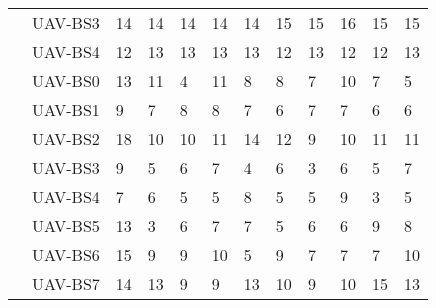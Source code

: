 \begin{table}[]
\begin{tabular}{|ll|l|l|l|l|l|l|l|l|l|l|}
\multicolumn{1}{|c|}{\cellcolor[HTML]{EFEFEF}}                                & UAV-BS3 & 14          & 14          & 14          & 14          & 14          & 15          & 15          & 16          &  15         & 15            \\ \cline{2-12} 
\rowcolor[HTML]{EFEFEF} 
\multicolumn{1}{|c|}{\multirow{-5}{*}{\cellcolor[HTML]{EFEFEF}\textbf{exp2}}} & UAV-BS4 & 12          & 13          & 13          & 13          & 13          & 12          & 13          & 12          & 12          & 13           \\ \hline
\multicolumn{1}{|l|}{}                                                        & UAV-BS0 & 13          & 11          & 4           & 11          & 8           & 8           & 7           & 10          & 7           & 5            \\ \cline{2-12} 
\multicolumn{1}{|l|}{}                                                        & UAV-BS1 & 9           & 7           & 8           & 8           & 7           & 6           & 7           & 7           & 6           & 6            \\ \cline{2-12} 
\multicolumn{1}{|l|}{}                                                        & UAV-BS2 & 18          & 10          & 10          & 11          & 14          & 12          & 9           & 10          & 11          & 11            \\ \cline{2-12} 
\multicolumn{1}{|l|}{}                                                        & UAV-BS3 & 9           & 5           & 6           & 7           & 4           & 6           & 3           & 6           & 5           & 7            \\ \cline{2-12} 
\multicolumn{1}{|l|}{}                                                        & UAV-BS4 & 7           & 6           & 5           & 5           & 8           & 5           & 5           & 9           & 3           & 5            \\ \cline{2-12} 
\multicolumn{1}{|l|}{}                                                        & UAV-BS5 & 13          & 3           & 6           & 7           & 7           & 5           & 6           & 6           & 9           & 8            \\ \cline{2-12} 
\multicolumn{1}{|l|}{}                                                        & UAV-BS6 & 15          & 9           & 9           & 10          & 5           & 9           & 7           & 7           & 7           & 10            \\ \cline{2-12} 
\multicolumn{1}{|l|}{}                                                        & UAV-BS7 & 14          & 13          & 9           & 9           & 13          & 10          & 9           & 10          & 15          & 13            \\ \cline{2-12} 

\end{tabular}
\end{table}

